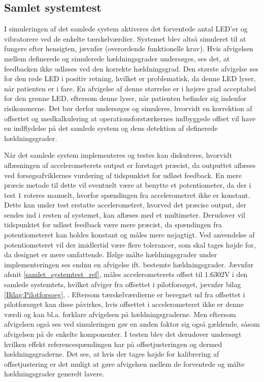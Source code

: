 \subsection{Samlet systemtest }
I simuleringen af det samlede system aktiveres det forventede antal LED'er og vibratorere ved de enkelte tærskelværdier. Systemet blev altså simuleret til at fungere efter hensigten, jævnfør (overordende funktionelle krav). Hvis afvigelsen mellem definerede og simulerede hældningsgrader undersøges, ses det, at feedbacken ikke udløses ved den korrekte hældningsgrad. Den største afvigelse ses for den røde LED i positiv retning, hvilket er problematisk, da denne LED lyser, når patienten er i fare. En afvigelse af denne størrelse er i højere grad acceptabel for den grønne LED, eftersom denne lyser, når patienten befinder sig indenfor risikozonerne. Det bør derfor undersøges og simuleres, hvorvidt en korrektion af offsettet og medkalkulering at operationsforstærkernes indbyggede offset vil have en indflydelse på det samlede system og dens detektion af definerede hældningsgrader. 

Når det samlede system implementeres og testes kan diskuteres, hvorvidt aflæsningen af accelerometerets output er foretaget præcist, da outputtet aflæses ved forsøgsafviklernes vurdering af tidspunktet for udløst feedback. En mere præcis metode til dette vil eventuelt være at benytte et potentiometer, da der i test $1$ roteres manuelt, hvorfor spændingen fra accelerometret ikke er konstant. Dette kan under test erstatte accelerometret, hvorved det præcise output, der sendes ind i resten af systemet, kan aflæses med et multimeter. Derudover vil tidspunktet for udløst feedback være mere præcist, da spændingen fra potentiometeret kan holdes konstant og måles mere nøjagtigt. Ved anvendelse af potentiometeret vil der imidlertid være flere tolerancer, som skal tages højde for, da designet er mere omfattende. Ifølge målte hældningsgrader under implementeringen ses endnu en afvigelse ift. bestemte hældningsgrader. Jævnfør afsnit \ref{samlet_systemtest_ref}, \pageref{samlet_systemtest_ref} måles accelerometerets offset til $1.6302$V i den samlede systemtets, hvilket afviger fra offsettet i pilotforsøget, jævnfør bilag \ref{Bilag:Pilotforsoeg}, \pageref{Bilag:Pilotforsoeg}. Eftersom tærskelværdierne er beregnet ud fra offsettet i pilotforsøget kan disse påvirkes, hvis offsettet i accelerometeret ikke er denne værdi og kan bl.a. forklare afvigelsen på hældningsgraderne. Men eftersom afvigelsen også ses ved simuleringen gør en anden faktor sig også gældende, såsom afvigelsen på de enkelte komponenter. 
I testen blev det derudover undersøgt hvilken effekt referencespændingen har på offsetjusteringen og dermed hældningsgraderne. Det ses, at hvis der tages højde for kalibrering af offsetjustering er det muligt at gøre afvigelsen mellem de forventede og målte hældningsgrader generelt lavere. 

